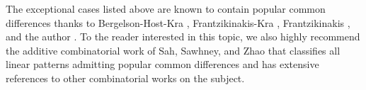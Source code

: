 \documentclass[11pt]{amsart}
\theoremstyle{definition}
\newcommand{\1}{{\mathbf{1}}}
\begin{document}
The exceptional cases listed above are known to contain popular common differences thanks to Bergelson-Host-Kra \cite[Theorem 1.2]{BHK05}, Frantzikinakis-Kra \cite[Theorem 1.3]{FrKr06}, Frantzikinakis \cite[Theorem C]{Fr08}, and the author \cite[Theorem 1.16]{Kuc22a}. To the reader interested in this topic, we also highly recommend the additive combinatorial work of Sah, Sawhney, and Zhao \cite{SSZ21} that classifies all linear patterns admitting popular common differences and has extensive references to other combinatorial works on the subject.


\end{document}
